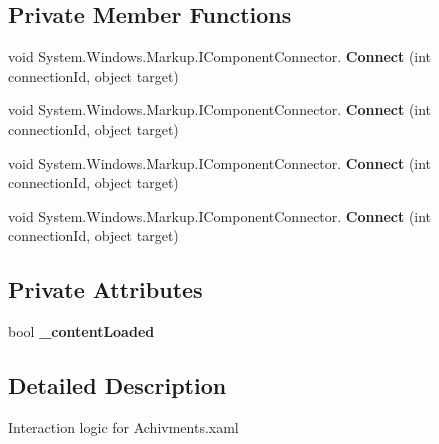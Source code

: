\subsection*{Private Member Functions}
\begin{DoxyCompactItemize}
\item 
\mbox{\label{class_t_h_b___plugin___social_1_1_achivments_1_1_achivments_a1ba800d5953f08b8d81e731da0c441ac}} 
void System.\+Windows.\+Markup.\+I\+Component\+Connector. {\bfseries Connect} (int connection\+Id, object target)
\item 
\mbox{\label{class_t_h_b___plugin___social_1_1_achivments_1_1_achivments_a1ba800d5953f08b8d81e731da0c441ac}} 
void System.\+Windows.\+Markup.\+I\+Component\+Connector. {\bfseries Connect} (int connection\+Id, object target)
\item 
\mbox{\label{class_t_h_b___plugin___social_1_1_achivments_1_1_achivments_a1ba800d5953f08b8d81e731da0c441ac}} 
void System.\+Windows.\+Markup.\+I\+Component\+Connector. {\bfseries Connect} (int connection\+Id, object target)
\item 
\mbox{\label{class_t_h_b___plugin___social_1_1_achivments_1_1_achivments_a1ba800d5953f08b8d81e731da0c441ac}} 
void System.\+Windows.\+Markup.\+I\+Component\+Connector. {\bfseries Connect} (int connection\+Id, object target)
\end{DoxyCompactItemize}
\subsection*{Private Attributes}
\begin{DoxyCompactItemize}
\item 
\mbox{\label{class_t_h_b___plugin___social_1_1_achivments_1_1_achivments_ab8b036a3f1931db6974296216d403fd0}} 
bool {\bfseries \+\_\+content\+Loaded}
\end{DoxyCompactItemize}


\subsection{Detailed Description}
Interaction logic for Achivments.\+xaml 

